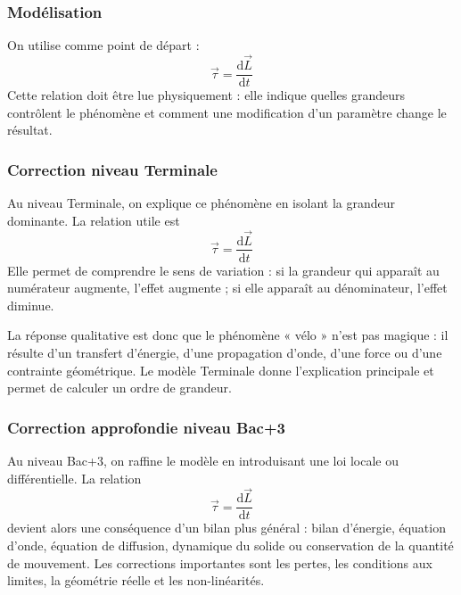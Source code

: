 \documentclass[11pt,a4paper]{article}
\begin{document}
\subsubsection*{Modélisation}

\begin{theorembox}
On utilise comme point de départ :
\[
\vec\tau=\frac{\mathrm d\vec L}{\mathrm dt}
\]
Cette relation doit être lue physiquement : elle indique quelles grandeurs contrôlent le phénomène et comment une modification d'un paramètre change le résultat.
\end{theorembox}

\subsubsection*{Correction niveau Terminale}

\begin{corrigebox}

Au niveau Terminale, on explique ce phénomène en isolant la grandeur dominante. La relation utile est
\[
\vec\tau=\frac{\mathrm d\vec L}{\mathrm dt}
\]
Elle permet de comprendre le sens de variation : si la grandeur qui apparaît au numérateur augmente, l'effet augmente ; si elle apparaît au dénominateur, l'effet diminue.

La réponse qualitative est donc que le phénomène « vélo » n'est pas magique : il résulte d'un transfert d'énergie, d'une propagation d'onde, d'une force ou d'une contrainte géométrique. Le modèle Terminale donne l'explication principale et permet de calculer un ordre de grandeur.

\end{corrigebox}

\subsubsection*{Correction approfondie niveau Bac+3}

\begin{approfondissementbox}

Au niveau Bac+3, on raffine le modèle en introduisant une loi locale ou différentielle. La relation
\[
\vec\tau=\frac{\mathrm d\vec L}{\mathrm dt}
\]
devient alors une conséquence d'un bilan plus général : bilan d'énergie, équation d'onde, équation de diffusion, dynamique du solide ou conservation de la quantité de mouvement. Les corrections importantes sont les pertes, les conditions aux limites, la géométrie réelle et les non-linéarités.

\end{approfondissementbox}
\end{document}
